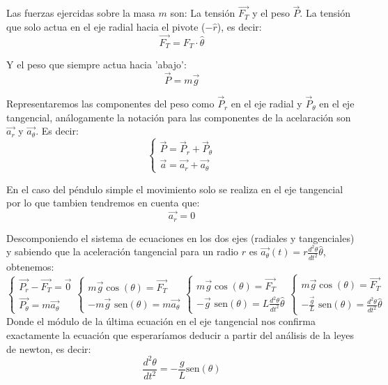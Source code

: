 Las fuerzas ejercidas sobre la masa $m$ son: La tensión $\vec{F_T}$ y el peso $\vec{P}$. La tensión que solo actua en el eje radial hacia el pivote ($-\hat{r}$), es decir:
\begin{equation}
    \vec{F_T}=F_T \cdot\hat{\theta}
\end{equation}

Y el peso que siempre actua hacia 'abajo':
\begin{equation}
    \vec{P}=m\vec{g}
\end{equation}


Representaremos las componentes del peso como $\vec{P}_r$ en el eje radial y $\vec{P}_{\theta}$ en el eje tangencial, análogamente la notación para las componentes de la acelaración son $\vec{a_r}$ y $\vec{a_\theta}$. Es decir:
\begin{equation}
    \begin{cases}
        \vec{P}=\vec{P}_r+\vec{P}_{\theta}\\
        \vec{a}= \vec{a_r} + \vec{a_\theta}
    \end{cases}
\end{equation}

En el caso del péndulo simple el movimiento solo se realiza en el eje tangencial por lo que tambien tendremos en cuenta que:
\begin{equation}
    \vec{a_r}=0
\end{equation}

Descomponiendo el sistema de ecuaciones en los dos ejes (radiales y tangenciales) y sabiendo que la aceleración tangencial para un radio $r$ es $\vec{a_\theta}(t)=r\frac{d^2\theta}{dt^2}\hat{\theta}$, obtenemos:
\begin{equation}
        \begin{cases}
             \vec{P_r}-\vec{F_T}=\vec{0}\\
             \vec{P_{\theta}}=m\vec{a_\theta}
        \end{cases}
        \begin{cases}
            m\vec{g}\cos(\theta)=\vec{F_T}\\
            -m\vec{g}\text{ sen}(\theta)=m\vec{a_\theta}
        \end{cases}
        \begin{cases}
            m\vec{g}\cos(\theta)=\vec{F_T}\\
            -\vec{g}\text{ sen}(\theta)=L\frac{d^2\theta}{dt^2}\hat{\theta}
        \end{cases}
        \begin{cases}
            m\vec{g}\cos(\theta)=\vec{F_T}\\
            -\frac{\vec{g}}{L}\text{ sen}(\theta)=\frac{d^2\theta}{dt^2}\hat{\theta}
        \end{cases}
\end{equation}
Donde el módulo de la última ecuación en el eje tangencial nos confirma exactamente la ecuación que esperaríamos deducir a partir del análisis de la leyes de newton, es decir:
\begin{equation}
    \frac{d^2\theta}{dt^2} = -\frac{g}{L} \text{sen}(\theta)
\end{equation}


